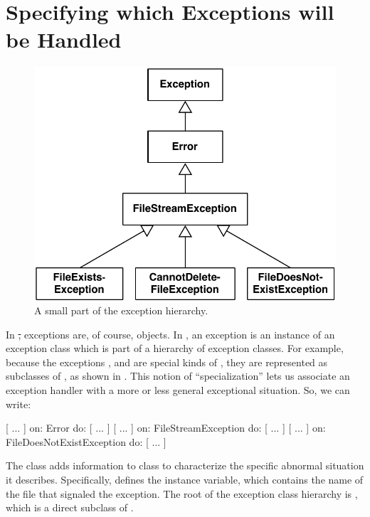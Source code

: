 \documentclass[a4paper,10pt,twoside]{book}
\begin{document}
\section{Specifying which Exceptions will be Handled}


\begin{figure}[t]\centering
        \includegraphics[width=.5\linewidth]{SimpleHierarchy}
        \caption{A small part of the \pharo exception hierarchy.}
\end{figure}


In \st, exceptions are, of course, objects. 
In \pharo{}, an exception is an instance of an exception class which is part of a hierarchy of exception classes.
For example, 
because the exceptions ,  and  are special kinds of , they are represented as subclasses of , as shown in .
This notion of ``specialization'' lets us associate an exception handler with a more or less general exceptional situation.
So, we can write:
\begin{code}{}
[ ... ] on: Error do: [ ... ]
[ ... ] on: FileStreamException do: [ ... ]
[ ... ] on: FileDoesNotExistException do: [ ... ]
\end{code}


The class  adds information to class  to characterize the specific abnormal situation it describes. Specifically,  defines the  instance variable, which contains the name of the file that signaled the exception. The root of the exception class hierarchy is , which is a direct subclass of .

\end{document}
